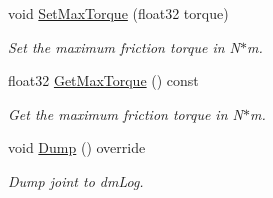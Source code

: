 \begin{DoxyCompactItemize}
void \hyperlink{classb2FrictionJoint_a9e3aaf485dc86a378bb62ee78cea43aa}{Set\+Max\+Torque} (float32 torque)
\begin{DoxyCompactList}\small\item\em Set the maximum friction torque in N$\ast$m. \end{DoxyCompactList}\item 
\mbox{\label{classb2FrictionJoint_ae926972faa5846436cbcfe5772adc1f6}} 
float32 \hyperlink{classb2FrictionJoint_ae926972faa5846436cbcfe5772adc1f6}{Get\+Max\+Torque} () const
\begin{DoxyCompactList}\small\item\em Get the maximum friction torque in N$\ast$m. \end{DoxyCompactList}\item 
\mbox{\label{classb2FrictionJoint_a934a3ce5bda09bc07111c1dd4e192406}} 
void \hyperlink{classb2FrictionJoint_a934a3ce5bda09bc07111c1dd4e192406}{Dump} () override
\begin{DoxyCompactList}\small\item\em Dump joint to dm\+Log. \end{DoxyCompactList}\end{DoxyCompactItemize}
